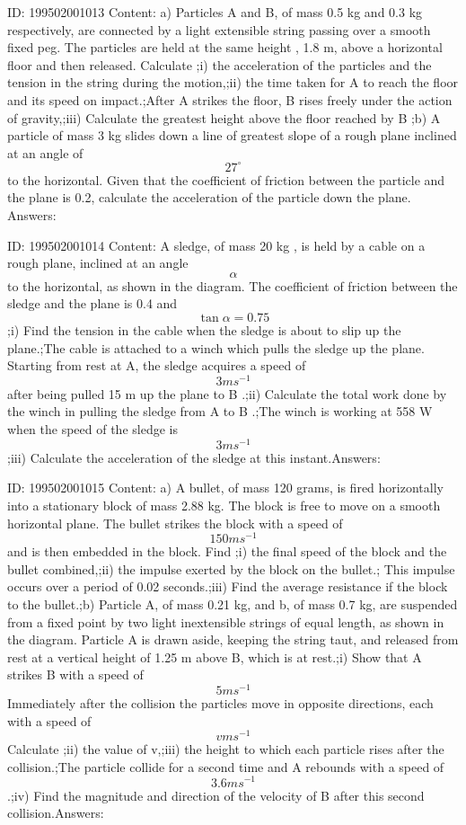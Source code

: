 \documentclass{article}
\begin{document}
ID: 199502001013
Content:
a) Particles A and B, of mass 0.5 kg and 0.3 kg respectively, are connected by a light extensible string passing over a smooth fixed peg. The particles are held at the same height , 1.8 m, above a horizontal floor and then released. Calculate 
;i) the acceleration of the particles and the tension in the string during the motion,;ii) the time taken for A to reach the floor and its speed on impact.;After A strikes the floor, B rises freely under the action of gravity,;iii) Calculate the greatest height above the floor reached by B ;b) A particle of mass 3 kg slides down a line of greatest slope of a rough plane inclined at an angle of \[27^{\circ}\]  to the horizontal. Given that the coefficient of friction between the particle and the plane is 0.2, calculate the acceleration of the particle down the plane.
Answers:

ID: 199502001014
Content:
A sledge, of mass 20 kg , is held by a cable on a rough plane, inclined at an angle \[\alpha\] to the horizontal, as shown in the diagram. The coefficient of friction between the sledge and the plane is 0.4 and \[\tan \alpha =0.75\];i) Find the tension in the cable when the sledge is about to slip up the plane.;The cable is attached to a winch which pulls the sledge up the plane. Starting from rest at A, the sledge acquires a speed of \[3ms^{-1} \] after being pulled 15 m up the plane to B .;ii) Calculate the total work done by the winch in pulling the sledge from A to B .;The winch is working at 558 W when the speed of the sledge is \[3ms^{-1} \];iii) Calculate the acceleration of the sledge at this instant.Answers:

ID: 199502001015
Content:
a) A bullet, of mass 120 grams, is fired horizontally into a stationary block of mass 2.88 kg. The block is free to move on a smooth horizontal plane. The bullet strikes the block with a speed of \[150ms^{-1} \] and is then embedded in the block. Find ;i) the final speed of the block and the bullet combined,;ii) the impulse exerted by the block on the bullet.;    This impulse occurs over a period of 0.02 seconds.;iii) Find the average resistance if the block to the bullet.;b) Particle A, of mass 0.21 kg, and b, of mass 0.7 kg, are suspended from a fixed point by two light inextensible strings of equal length, as shown in the diagram. Particle A is drawn aside, keeping the string taut, and released from rest at a vertical height of 1.25 m above B, which is at rest.;i) Show that A strikes B with a speed of \[5ms^{-1} \] Immediately after the collision the particles move in opposite directions, each with a speed of \[vms^{-1} \] Calculate  ;ii) the value of v,;iii) the height to which each particle rises after the collision.;The particle collide for a second time and A rebounds with a speed of \[3.6ms^{-1} \].;iv) Find the magnitude and direction of the velocity of B after this second collision.Answers:
\end{document}
